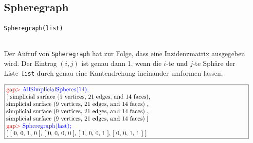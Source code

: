 \documentclass[12pt,titlepage,twoside,cleardoublepage]{article}
\theoremstyle{nummermitklammern}
\numberwithin{equation}{section}
\begin{document}
\subsection{Spheregraph}
\begin{large}
\texttt{Spheregraph(list)}
\end{large}\\
Der Aufruf von \texttt{Spheregraph} hat zur Folge, dass eine Inzidenzmatrix ausgegeben wird. Der Eintrag $(i,j)$ ist genau dann 1, wenn die $i$-te und $j$-te Sphäre der Liste \texttt{list} durch genau eine Kantendrehung ineinander umformen lassen. 
\begin{center}
$\fbox{\parbox{14cm}{
\textcolor{red}{gap$>$} \textcolor{blue}{AllSimplicialSpheres(14);}\newline
[ simplicial surface (9 vertices, 21 edges, and 14 faces),\newline
 simplicial surface (9 vertices, 21 edges, and 14 faces)
    ,\newline
     simplicial surface (9 vertices, 21 edges, and 14 faces)
    ,\newline
  simplicial surface (9 vertices, 21 edges, and 14 faces)
 ]\newline
\textcolor{red}{gap$>$} \textcolor{blue}{Spheregraph(last);}\newline
[ [ 0, 0, 1, 0 ], [ 0, 0, 0, 0 ], [ 1, 0, 0, 1 ], [ 0, 0, 1, 1 ] ]
}}$
\end{center}
\end{document}
